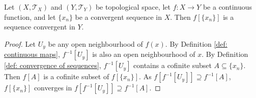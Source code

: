 \begin{proposition}
	Let $(X, \mathcal T_X)$ and $(Y, \mathcal T_Y)$ be topological space, let $f: X \to Y$ be a continuous function, and let $\{x_n\}$ be a convergent sequence in $X$. Then $f[\{x_n\}]$ is a sequence convergent in $Y$.
	
	\begin{proof}
		Let $U_y$ be any open neighbourhood of $f(x)$. By Definition \ref{def: continuous maps}, $f^{-1}[U_y]$ is also an open neighbourhood of $x$. By Definition \ref{def: convergence of sequences}, $f^{-1}[U_y]$ contains a cofinite subset $A \subseteq \{x_n\}$. Then $f[A]$ is a cofinite subset of $f[\{x_n\}]$. As $f[f^{-1}[U_y]] \supseteq f^{-1}[A]$, $f[\{x_n\}]$ converges in $f[f^{-1}[U_y]] \supseteq f^{-1}[A]$.
	\end{proof}		
\end{proposition}







































%